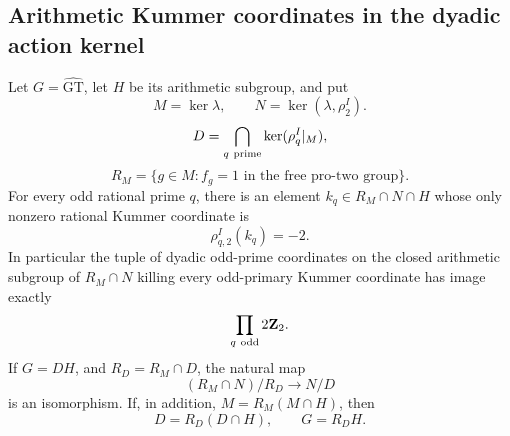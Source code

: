 \subsection{Arithmetic Kummer coordinates in the dyadic action kernel}

\begin{proposition}
\label{prop:arithmetic-kummer-kernel-axes}
Let \(G=\widehat{\mathrm{GT}}\), let \(H\) be its arithmetic subgroup, and put
\[
 M=\ker\lambda,\qquad N=\ker(\lambda,\rho_2^I).
\]
\[
 D=\bigcap_{q\ {\rm prime}}\ker(\rho_q^I|_M),
\]
\[
 R_M=\{g\in M:f_g=1\text{ in the free pro-two group}\}.
\]
For every odd rational prime \(q\), there is an element
\(k_q\in R_M\cap N\cap H\) whose only nonzero rational Kummer
coordinate is
\[
 \rho_{q,2}^I(k_q)=-2.
\]
In particular the tuple of dyadic odd-prime coordinates on the closed
arithmetic subgroup of \(R_M\cap N\) killing every odd-primary
Kummer coordinate has image exactly
\begin{equation}
 \prod_{q\ {\rm odd}}2\mathbf Z_2.                       \label{eq:arithmetic-kernel-axes-1}
\end{equation}
If \(G=DH\), and \(R_D=R_M\cap D\), the natural map
\[
 (R_M\cap N)/R_D\longrightarrow N/D
\]
is an isomorphism. If, in addition,
\(M=R_M(M\cap H)\), then
\[
 D=R_D(D\cap H),\qquad G=R_DH.
\]
\end{proposition}

